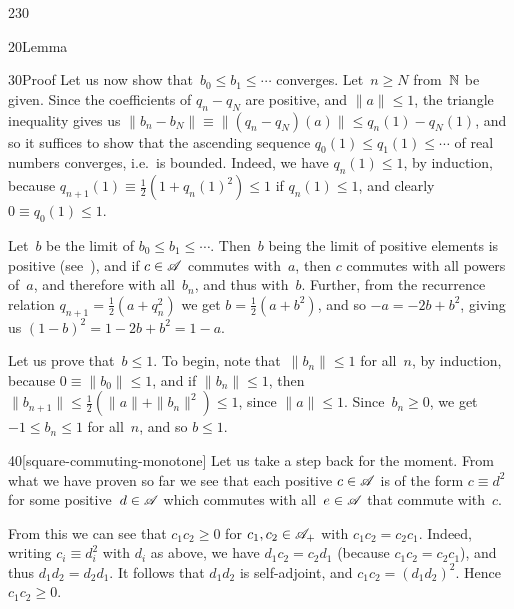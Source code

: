 \begin{parsec}{230}
\begin{point}{20}{Lemma}
\begin{point}{30}{Proof}
Let us now show that~$b_0\leq b_1\leq \dotsb$ converges.
Let~$n\geq N$ from~$\mathbb{N}$ be given.
Since the coefficients of $q_n-q_N$ are positive,
and $\|a\|\leq 1$,
the triangle inequality gives us
$\|b_n-b_N\|\equiv \|(q_n-q_N)(a)\|\leq q_n(1)-q_N(1)$,
and
so it suffices to 
show that the ascending sequence
 $q_0(1)\leq q_1(1)\leq \dotsb$
of real numbers
converges,
i.e.~is bounded.
Indeed,
we have $q_n(1)\leq 1$,
by induction,
because $q_{n+1}(1)\equiv \frac{1}{2}(1+q_n(1)^2)
\leq 1$ if $q_n(1)\leq 1$,
and clearly $0\equiv q_0(1)\leq 1$.

Let~$b$ be the limit of $b_0\leq b_1\leq\dotsb$.
Then~$b$ being the limit of positive elements
is positive
(see~),
and if $c\in \mathscr{A}$ commutes with~$a$,
then $c$ commutes with all powers of~$a$,
and therefore with all~$b_n$,
and thus with~$b$.
Further, 
from the recurrence relation $q_{n+1} = \frac{1}{2}(a+q_n^2)$
we get $b=\frac{1}{2}(a+b^2)$,
and so $-a = -2b+b^2$, 
giving us  $(1-b)^2 = 1-2b+b^2 = 1-a$.

Let us prove that~$b\leq 1$.
To begin, note that~$\|b_n\|\leq 1$ for all~$n$, by induction,
because $0\equiv \|b_0\|\leq 1$,
and if $\|b_n\|\leq 1$, then $\|b_{n+1}\|\leq \frac{1}{2}(\|a\|+\|b_n\|^2)
\leq 1$, since $\|a\|\leq 1$.
Since~$b_n\geq 0$, we get $-1\leq b_n\leq 1$ for all~$n$,
and so $b\leq 1$.

\begin{point}{40}[square-commuting-monotone]%
Let us take a step back for the moment.
From what we have proven so far
we see that each positive $c\in\mathscr{A}$
is of the form $c\equiv d^2$ for some positive~$d\in\mathscr{A}$
which commutes with all~$e\in \mathscr{A}$ that commute with~$c$.

From this we can see that $c_1c_2\geq 0$
for  
 $c_1,c_2 \in\mathscr{A}_{+}$
with $c_1c_2 = c_2c_1$.
Indeed, writing $c_i\equiv d_i^2$ with $d_i$ as above,
we have $d_1c_2=c_2d_1$ (because $c_1c_2=c_2c_1$), and thus 
$d_1d_2=d_2d_1$. It follows that $d_1d_2$ is self-adjoint,
and $c_1c_2 = (d_1d_2)^2$. Hence $c_1c_2\geq 0$.


\end{point}
\end{point}
\end{point}
\end{parsec}
